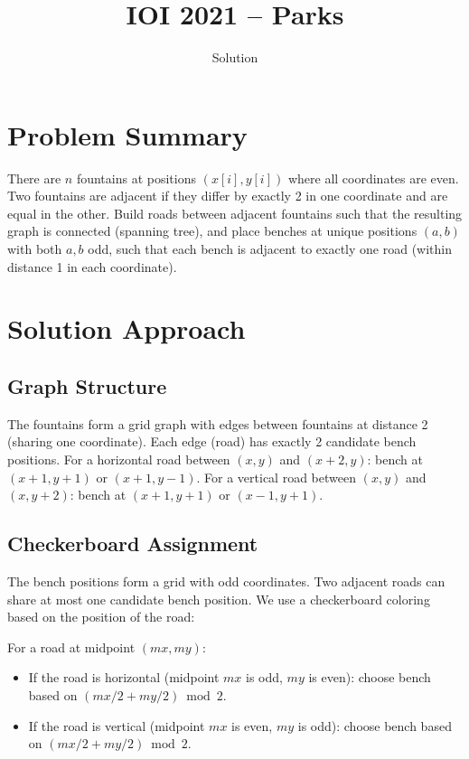 \documentclass[11pt,a4paper]{article}
\title{IOI 2021 -- Parks}
\author{Solution}
\date{}
\begin{document}
\maketitle

\section{Problem Summary}
There are $n$ fountains at positions $(x[i], y[i])$ where all coordinates are even. Two fountains are adjacent if they differ by exactly 2 in one coordinate and are equal in the other. Build roads between adjacent fountains such that the resulting graph is connected (spanning tree), and place benches at unique positions $(a, b)$ with both $a, b$ odd, such that each bench is adjacent to exactly one road (within distance 1 in each coordinate).

\section{Solution Approach}

\subsection{Graph Structure}
The fountains form a grid graph with edges between fountains at distance 2 (sharing one coordinate). Each edge (road) has exactly 2 candidate bench positions. For a horizontal road between $(x, y)$ and $(x+2, y)$: bench at $(x+1, y+1)$ or $(x+1, y-1)$. For a vertical road between $(x, y)$ and $(x, y+2)$: bench at $(x+1, y+1)$ or $(x-1, y+1)$.

\subsection{Checkerboard Assignment}
The bench positions form a grid with odd coordinates. Two adjacent roads can share at most one candidate bench position. We use a checkerboard coloring based on the position of the road:

For a road at midpoint $(mx, my)$:
\begin{itemize}
  \item If the road is horizontal (midpoint $mx$ is odd, $my$ is even): choose bench based on $(mx/2 + my/2) \bmod 2$.
  \item If the road is vertical (midpoint $mx$ is even, $my$ is odd): choose bench based on $(mx/2 + my/2) \bmod 2$.
\end{itemize}
\end{document}
